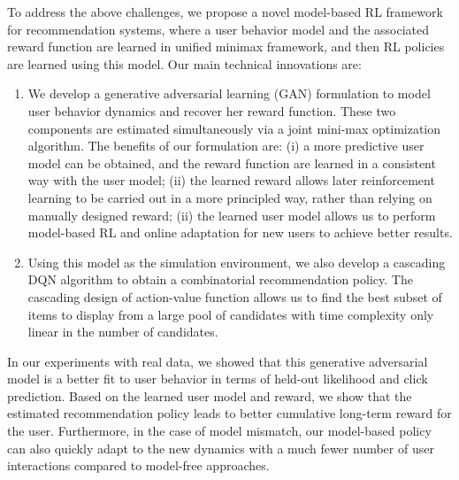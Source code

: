 \documentclass{article} %
\begin{document}
To address the above challenges, we propose a novel model-based RL framework for recommendation systems, where a user behavior model and the associated reward function are learned in unified minimax framework, and then RL policies are learned using this model. Our main  technical innovations are:
\begin{enumerate}
    \item We develop a generative adversarial learning ({\small GAN}) formulation to model user behavior dynamics and recover her reward function. These two components are estimated simultaneously via a joint mini-max optimization algorithm. The benefits of our formulation are: (i) a more predictive user model can be obtained, and the reward function are learned in a consistent way with the user model; (ii) the learned reward allows later reinforcement learning to be carried out in a more principled way, rather than relying on manually designed reward; (ii) the learned user model allows us to perform model-based RL and online adaptation for new users to achieve better results.  
    \item Using this model as the simulation environment, we also develop a cascading DQN algorithm to obtain a combinatorial recommendation policy. The cascading design of action-value function allows us to find the best subset of items to display from a large pool of candidates with time complexity only linear in the number of candidates. 
\end{enumerate}
In our experiments with real data, we showed that this generative adversarial model is a better fit to user behavior in terms of held-out likelihood and click prediction. Based on the learned user model and reward, we show that the estimated recommendation policy leads to better cumulative long-term reward for the user. Furthermore, in the case of model mismatch, our model-based policy can also quickly adapt to the new dynamics with a much fewer number of user interactions compared to model-free approaches.    
\end{document}
